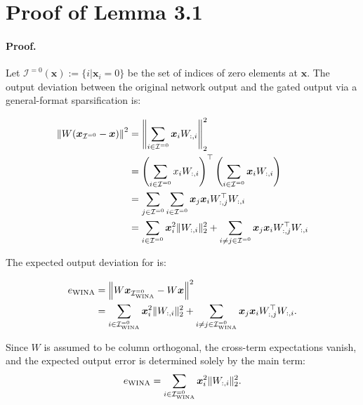 \section{Proof of Lemma 3.1}

\paragraph{Proof.} 

Let $\mathcal{I}^{=0}(\bm{x}):=\{i| \bm{x}_i=0\}$ be the set of indices of zero elements at $\bm{x}$. The output deviation between the original network output and the gated output via a general-format sparsification is:

\begin{align*}
	\norm{W(\bm{x}_{\mathcal{I}^{=0}} - \bm{x})}^2 &= \left\| \sum_{i\in \mathcal{I}^{=0}} \bm{x}_i W_{:,i} \right\|_2^2 \\
	&= \left( \sum_{i\in \mathcal{I}^{=0}} x_i W_{:,i} \right)^{\top} \left( \sum_{i\in \mathcal{I}^{=0}} \bm{x}_i W_{:,i} \right) \\
	&= \sum_{j \in  \mathcal{I}^{=0}} \sum_{i \in  \mathcal{I}^{=0}} \bm{x}_j \bm{x}_i W_{:,j}^\top W_{:,i} \\
	&= \sum_{i \in  \mathcal{I}^{=0}} \bm{x}_i^2 \| W_{:,i} \|_2^2 + \sum_{i\neq j  \in  \mathcal{I}^{=0}} \bm{x}_j \bm{x}_i W_{:,j}^\top W_{:,i}
\end{align*}

The expected output deviation for \algacro{} is:



\begin{align*}
	e_{\text{\algacro{}}} &= \norm{W\bm{x}_{\mathcal{I}^{=0}_{\text{\algacro{}}}} - W\bm{x}}^2 \\
	&= \sum_{i \in \mathcal{I}^{=0}_{\text{\algacro{}}}} \bm{x}_i^2 \| W_{:,i} \|_2^2 + \sum_{i \neq j \in \mathcal{I}^{=0}_{\text{\algacro{}}}} \bm{x}_j \bm{x}_i W_{:,j}^\top W_{:,i}.
\end{align*}

Since $W$ is assumed to be column orthogonal, the cross-term expectations vanish, and the expected output error is determined solely by the main term:
$$
e_{\text{\algacro{}}} = \sum_{i \in \mathcal{I}^{=0}_{\text{\algacro{}}}} \bm{x}_i^2 \| W_{:,i} \|_2^2.
$$

